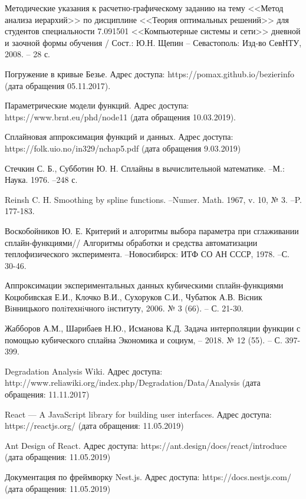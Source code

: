 \begin{thebibliography}{00}
    Методические указания к расчетно-графическому заданию
    на тему <<Метод анализа иерархий>>  по дисциплине <<Теория оптимальных решений>>
    для студентов специальности 7.091501 <<Компьютерные системы и сети>>
    дневной и заочной формы обучения /
    Сост.: Ю.Н. Щепин -- Севастополь:
    Изд-во СевНТУ, 2008. -- 28 с.

Погружение в кривые Безье. 
Адрес доступа: https://pomax.github.io/bezierinfo (дата обращения 05.11.2017).

Параметрические модели функций.
Адрес доступа: https://www.brnt.eu/phd/node11 (дата обращения 10.03.2019). 

Сплайновая аппроксимация функций и данных.
Адрес доступа: https://folk.uio.no/in329/nchap5.pdf (дата обращения 9.03.2019)

Стечкин С. Б., Субботин Ю. Н. Сплайны в вычислительной математике. --М.: 
Наука. 1976. --248 с.
    
Reinsh C. H. Smoothing by spline functions. --Numer. Math. 1967, v. 10, № 3. --P. 177-183. 	 

Воскобойников Ю. Е. Критерий и алгоритмы выбора параметра при сглаживании сплайн-функциями//
Алгоритмы обработки и средства автоматизации теплофизического эксперимента. --Новосибирск: ИТФ СО АН СССР, 1978. --С. 30-46.    

Аппроксимации экспериментальных данных кубическими сплайн-функциями
Коцюбивская Е.И., Клочко В.И., Сухоруков С.И., Чубатюк А.В.
Вiсник Вiнницького полiтехнiчного iнституту, 2006. № 3 (66). -- С. 21-30.

Жабборов А.М., Шарибаев Н.Ю., Исманова К.Д.
Задача интерполяции функции с помощью кубического сплайна
Экономика и социум, -- 2018. № 12 (55). -- С. 397-399. 

Degradation Analysis Wiki.
Адрес доступа: http://www.reliawiki.org/index.php/Degradation/Data/Analysis (дата обращения: 11.11.2017)

React --- A JavaScript library for building user interfaces.
Адрес доступа: https://reactjs.org/ (дата обращения: 11.05.2019)

Ant Design of React.
Адрес доступа: https://ant.design/docs/react/introduce (дата обращения: 11.05.2019)

Документация по фреймворку Nest.js.
Адрес доступа: https://docs.nestjs.com/ (дата обращения: 11.05.2019)
 

\end{thebibliography}
